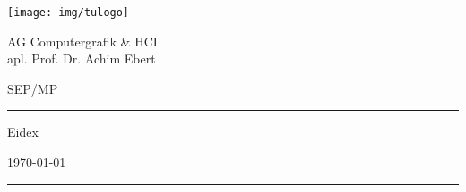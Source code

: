 	\thispagestyle{empty}
	\newcommand{\Rule}{\rule{\textwidth}{0.5mm}}
	\begin{center}
	{\Large \texttt{[image: img/tulogo]} \par}

	\vspace{0.5em}

	{\Large AG Computergrafik \& HCI \\ apl. Prof. Dr. Achim Ebert \par}

	\vspace{0.5em}

	{\Large SEP/MP \the\year \par}


	\vspace{5cm}

	\Rule

	\vspace{1cm}

	{\Huge Eidex \par}

	\vspace{0.5em}

	{\Large \mysubject \par}

	\vspace{0.5em}

	{\small \today \par}

	\vspace{0.7cm}

	\Rule


	\vfill %


	\emph{\textbf{\mygroup}} \\[1em]
	\myauthor

	\end{center}